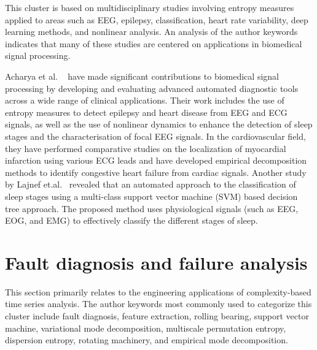 This cluster is based on multidisciplinary studies involving entropy measures applied to areas such as EEG, epilepsy, classification, heart rate variability, deep learning methods, and nonlinear analysis. An analysis of the author keywords indicates that many of these studies are centered on applications in biomedical signal processing. 

Acharya et al. ~\cite{Acharya2015a, Acharya2015, Acharya2017, Acharya2016, Acharya2019,  Acharya2017a, Acharya2018} have made significant contributions to biomedical signal processing by developing and evaluating advanced automated diagnostic tools across a wide range of clinical applications. Their work includes the use of entropy measures to detect epilepsy and heart disease from EEG and ECG signals, as well as the use of nonlinear dynamics to enhance the detection of sleep stages and the characterisation of focal EEG signals. In the cardiovascular field, they have performed comparative studies on the localization of myocardial infarction using various ECG leads and have developed empirical decomposition methods to identify congestive heart failure from cardiac signals. Another study by Lajnef et.al.~\cite{Lajnef2015} revealed that an automated approach to the classification of sleep stages using a multi-class support vector machine (SVM) based decision tree approach. The proposed method uses physiological signals (such as EEG, EOG, and EMG) to effectively classify the different stages of sleep.

\section{Fault diagnosis and failure analysis}\label{Sec:ReviewTopicFault}
This section primarily relates to the engineering applications of complexity-based time series analysis. The author keywords most commonly used to categorize this cluster include fault diagnosis, feature extraction, rolling bearing, support vector machine, variational mode decomposition, multiscale permutation entropy, dispersion entropy, rotating machinery, and empirical mode decomposition. 

